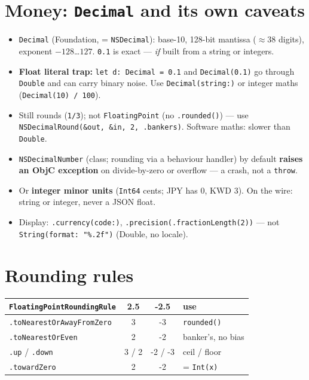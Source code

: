 \documentclass[8pt]{extarticle}
\begin{document}
\begin{multicols}{2}
\section{Money: \texttt{Decimal} and its own caveats}
\begin{itemize}
  \item \texttt{Decimal} (Foundation, = \texttt{NSDecimal}): base-10,
        128-bit mantissa ($\approx$38 digits), exponent $-128$…$127$.
        \texttt{0.1} is exact — \emph{if} built from a string or integers.
  \item \textbf{Float literal trap:} \texttt{let d: Decimal = 0.1} and
        \texttt{Decimal(0.1)} go through \texttt{Double} and can carry binary
        noise. Use \texttt{Decimal(string:)} or integer maths
        (\texttt{Decimal(10) / 100}).
  \item Still rounds (\texttt{1/3}); not \texttt{FloatingPoint} (no
        \texttt{.rounded()}) — use \texttt{NSDecimalRound(\&out, \&in, 2,
        .bankers)}. Software maths: slower than \texttt{Double}.
  \item \texttt{NSDecimalNumber} (class; rounding via a behaviour handler)
        by default \textbf{raises an ObjC exception} on divide-by-zero or
        overflow — a crash, not a \texttt{throw}.
  \item Or \textbf{integer minor units} (\texttt{Int64} cents; JPY has 0,
        KWD 3). On the wire: string or integer, never a JSON float.
  \item Display: \texttt{.currency(code:)},
        \texttt{.precision(.fractionLength(2))} — not
        \texttt{String(format: "\%.2f")} (Double, no locale).
\end{itemize}

\section{Rounding rules}
{\footnotesize
\begin{tabular}{@{}L{30mm}ccL{17mm}@{}}
\toprule
\textbf{\texttt{FloatingPointRoundingRule}} & \textbf{2.5} & \textbf{-2.5} & \textbf{use} \\
\midrule
\texttt{.toNearestOrAwayFromZero} & 3 & -3 & \texttt{rounded()} \\
\texttt{.toNearestOrEven} & 2 & -2 & banker's, no bias \\
\texttt{.up} / \texttt{.down} & 3 / 2 & -2 / -3 & ceil / floor \\
\texttt{.towardZero} & 2 & -2 & = \texttt{Int(x)} \\
\bottomrule
\end{tabular}}


\end{multicols}
\end{document}
